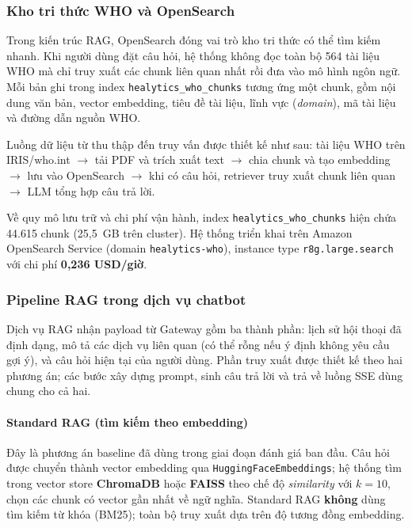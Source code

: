 \subsubsection{Kho tri thức WHO và OpenSearch}

Trong kiến trúc RAG, OpenSearch đóng vai trò kho tri thức có thể tìm kiếm nhanh. Khi người dùng đặt câu hỏi, hệ thống không đọc toàn bộ 564 tài liệu WHO mà chỉ truy xuất các chunk liên quan nhất rồi đưa vào mô hình ngôn ngữ. Mỗi bản ghi trong index \texttt{healytics\_who\_chunks} tương ứng một chunk, gồm nội dung văn bản, vector embedding, tiêu đề tài liệu, lĩnh vực (\textit{domain}), mã tài liệu và đường dẫn nguồn WHO.

Luồng dữ liệu từ thu thập đến truy vấn được thiết kế như sau: tài liệu WHO trên IRIS/who.int $\rightarrow$ tải PDF và trích xuất text $\rightarrow$ chia chunk và tạo embedding $\rightarrow$ lưu vào OpenSearch $\rightarrow$ khi có câu hỏi, retriever truy xuất chunk liên quan $\rightarrow$ LLM tổng hợp câu trả lời.

Về quy mô lưu trữ và chi phí vận hành, index \texttt{healytics\_who\_chunks} hiện chứa 44.615 chunk (25,5~GB trên cluster). Hệ thống triển khai trên Amazon OpenSearch Service (domain \texttt{healytics-who}), instance type \texttt{r8g.large.search} với chi phí \textbf{0,236 USD/giờ}.

\subsubsection{Pipeline RAG trong dịch vụ chatbot}

Dịch vụ RAG nhận payload từ Gateway gồm ba thành phần: lịch sử hội thoại đã định dạng, mô tả các dịch vụ liên quan (có thể rỗng nếu ý định không yêu cầu gợi ý), và câu hỏi hiện tại của người dùng. Phần truy xuất được thiết kế theo hai phương án; các bước xây dựng prompt, sinh câu trả lời và trả về luồng SSE dùng chung cho cả hai.

\paragraph{Standard RAG (tìm kiếm theo embedding)}

Đây là phương án baseline đã dùng trong giai đoạn đánh giá ban đầu. Câu hỏi được chuyển thành vector embedding qua \texttt{HuggingFaceEmbeddings}; hệ thống tìm trong vector store \textbf{ChromaDB} hoặc \textbf{FAISS} theo chế độ \textit{similarity} với $k = 10$, chọn các chunk có vector gần nhất về ngữ nghĩa. Standard RAG \textbf{không} dùng tìm kiếm từ khóa (BM25); toàn bộ truy xuất dựa trên độ tương đồng embedding.

